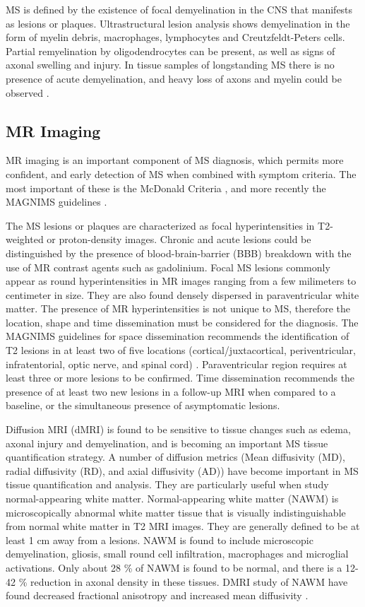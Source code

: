 MS is defined by the existence of focal demyelination in the CNS that manifests as lesions or plaques. Ultrastructural lesion analysis shows demyelination in the form of myelin debris, macrophages, lymphocytes and Creutzfeldt-Peters cells. Partial remyelination by oligodendrocytes can be present, as well as signs of axonal swelling and injury. In tissue samples of longstanding MS there is no presence of acute demyelination, and heavy loss of axons and myelin could be observed \cite{Filippi2012}. 

\subsection{MR Imaging}

MR imaging is an important component of MS diagnosis, which permits more confident, and early detection of MS when combined with symptom criteria. The most important of these is the McDonald Criteria \cite{Polman2011}, and more recently the MAGNIMS guidelines \cite{Filippi2016}. 

The MS lesions or plaques are characterized as focal hyperintensities in T2-weighted or proton-density images. Chronic and acute lesions could be distinguished by the presence of blood-brain-barrier (BBB) breakdown with the use of MR contrast agents such as gadolinium. Focal MS lesions commonly appear as round hyperintensities in MR images ranging from a few milimeters to centimeter in size. They are also found densely dispersed in paraventricular white matter. The presence of MR hyperintensities is not unique to MS, therefore the location, shape and time dissemination must be considered for the diagnosis. The MAGNIMS guidelines for space dissemination recommends the identification of T2 lesions in at least two of five locations (cortical/juxtacortical, periventricular, infratentorial, optic nerve, and spinal cord) \cite{Filippi2016}. Paraventricular region requires at least three or more lesions to be confirmed. Time dissemination recommends the presence of at least two new lesions in a follow-up MRI when compared to a baseline, or the simultaneous presence of asymptomatic lesions. 

Diffusion MRI (dMRI) is found to be sensitive to tissue changes such as edema, axonal injury and demyelination, and is becoming an important MS tissue quantification strategy. A number of diffusion metrics (Mean diffusivity (MD), radial diffusivity (RD), and axial diffusivity (AD)) have become important in MS tissue quantification and analysis.  They are particularly useful when study normal-appearing white matter. Normal-appearing white matter (NAWM) is microscopically abnormal white matter tissue that is visually indistinguishable from normal white matter in T2 MRI images. They are generally defined to be at least 1 cm away from a lesions. NAWM is found to include microscopic demyelination, gliosis, small round cell infiltration, macrophages and microglial activations. Only about 28 \% of NAWM is found to be normal, and there is a 12-42 \% reduction in axonal density in these tissues. DMRI study of NAWM have found decreased fractional anisotropy and increased mean diffusivity \cite{Ciccarelli2003d,DeGroot2013}.  

